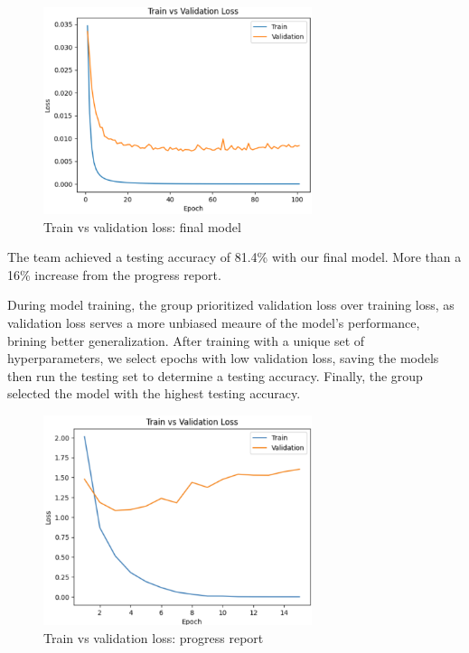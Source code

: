 \documentclass{article} %
\begin{document}
\FloatBarrier
\begin{figure}[h]
    \begin{center}
    \includegraphics[width=0.7\textwidth]{figures/trainValidationLoss_finalModel.png}
    \end{center}
    \caption{Train vs validation loss: final model}
    \label{fig:finalModelResult}
\end{figure}
\FloatBarrier

The team achieved a testing accuracy of 81.4\% with our final model. More than a 16\% increase from the progress report.

During model training, the group prioritized validation loss over training loss, as validation loss serves a more unbiased meaure of the model's performance, brining better generalization. After training with a unique set of hyperparameters, we select epochs with low validation loss, saving the models then run the testing set to determine a testing accuracy. Finally, the group selected the model with the highest testing accuracy.

\FloatBarrier
\begin{figure}[h]
    \begin{center}
    \includegraphics[width=0.7\textwidth]{figures/validationLossGraph.png}
    \end{center}
    \caption{Train vs validation loss: progress report}
    \label{fig:progressReportResult}
\end{figure}
\FloatBarrier
\end{document}
